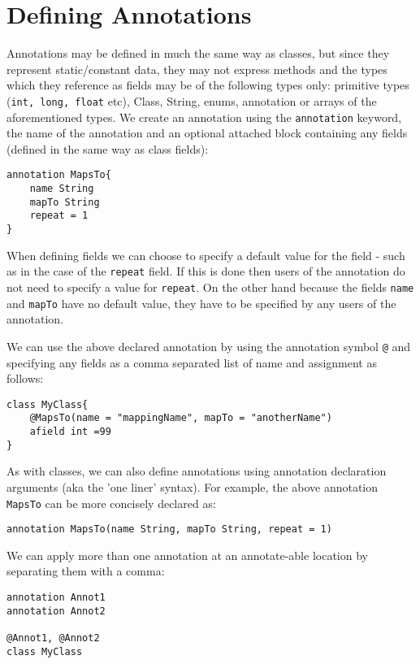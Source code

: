 \documentclass[conc-doc]{subfiles}
\begin{document}
\section{Defining Annotations}
Annotations may be defined in much the same way as classes, but since they represent static/constant data, they may not express methods and the types which they reference as fields may be of the following types only: primitive types (\lstinline{int, long, float} etc), Class, String, enums, annotation or arrays of the aforementioned types. We create an annotation using the \lstinline{annotation} keyword, the name of the annotation and an optional attached block containing any fields (defined in the same way as class fields):

\begin{lstlisting}
annotation MapsTo{
	name String
	mapTo String
	repeat = 1
}
\end{lstlisting}

When defining fields we can choose to specify a default value for the field - such as in the case of the \lstinline{repeat} field. If this is done then users of the annotation do not need to specify a value for \lstinline{repeat}. On the other hand because the fields \lstinline{name} and \lstinline{mapTo} have no default value, they have to be specified by any users of the annotation.

We can use the above declared annotation by using the annotation symbol \lstinline{@} and specifying any fields as a comma separated list of name and assignment as follows:

\begin{lstlisting}
class MyClass{
	@MapsTo(name = "mappingName", mapTo = "anotherName")
	afield int =99
}
\end{lstlisting}

As with classes, we can also define annotations using annotation declaration arguments (aka the 'one liner' syntax). For example, the above annotation \lstinline{MapsTo} can be more concisely declared as:
\begin{lstlisting}
annotation MapsTo(name String, mapTo String, repeat = 1)
\end{lstlisting}

We can apply more than one annotation at an annotate-able location by separating them with a comma:

\begin{lstlisting}
annotation Annot1
annotation Annot2

@Annot1, @Annot2
class MyClass
\end{lstlisting}
\end{document}
